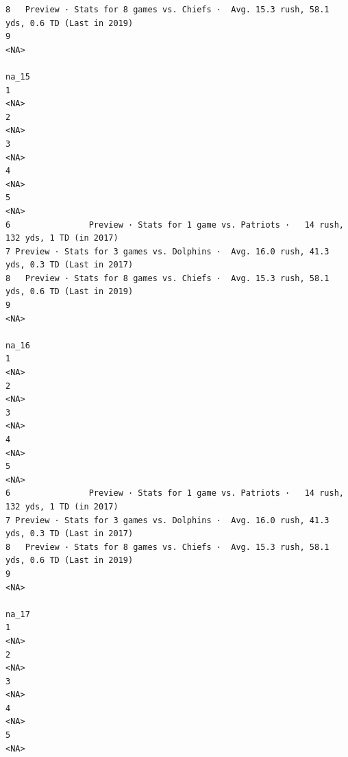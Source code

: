 \documentclass[
]{article}
\begin{document}
\begin{verbatim}
8   Preview · Stats for 8 games vs. Chiefs ·  Avg. 15.3 rush, 58.1 yds, 0.6 TD (Last in 2019)
9                                                                                        <NA>
                                                                                        na_15
1                                                                                        <NA>
2                                                                                        <NA>
3                                                                                        <NA>
4                                                                                        <NA>
5                                                                                        <NA>
6                Preview · Stats for 1 game vs. Patriots ·   14 rush, 132 yds, 1 TD (in 2017)
7 Preview · Stats for 3 games vs. Dolphins ·  Avg. 16.0 rush, 41.3 yds, 0.3 TD (Last in 2017)
8   Preview · Stats for 8 games vs. Chiefs ·  Avg. 15.3 rush, 58.1 yds, 0.6 TD (Last in 2019)
9                                                                                        <NA>
                                                                                        na_16
1                                                                                        <NA>
2                                                                                        <NA>
3                                                                                        <NA>
4                                                                                        <NA>
5                                                                                        <NA>
6                Preview · Stats for 1 game vs. Patriots ·   14 rush, 132 yds, 1 TD (in 2017)
7 Preview · Stats for 3 games vs. Dolphins ·  Avg. 16.0 rush, 41.3 yds, 0.3 TD (Last in 2017)
8   Preview · Stats for 8 games vs. Chiefs ·  Avg. 15.3 rush, 58.1 yds, 0.6 TD (Last in 2019)
9                                                                                        <NA>
                                                                                        na_17
1                                                                                        <NA>
2                                                                                        <NA>
3                                                                                        <NA>
4                                                                                        <NA>
5                                                                                        <NA>

\end{verbatim}
\end{document}
